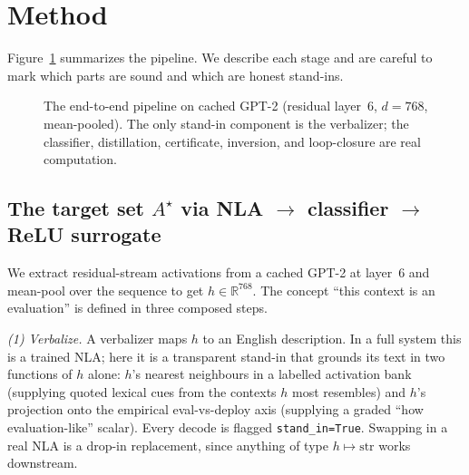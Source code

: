 \section{Method}
\label{sec:method}

Figure~\ref{fig:pipeline} summarizes the pipeline. We describe each stage and are
careful to mark which parts are sound and which are honest stand-ins.

\begin{figure}[t]
\centering
{}
\caption{The end-to-end pipeline on cached GPT-2 (residual layer~6, $d=768$,
mean-pooled). The only stand-in component is the verbalizer; the classifier,
distillation, certificate, inversion, and loop-closure are real computation.}
\label{fig:pipeline}
\end{figure}

\subsection{The target set $A^\star$ via NLA $\to$ classifier $\to$ ReLU surrogate}

We extract residual-stream activations from a cached GPT-2 at layer~6 and mean-pool
over the sequence to get $h \in \mathbb{R}^{768}$. The concept ``this context is an
evaluation'' is defined in three composed steps.

\emph{(1) Verbalize.} A verbalizer maps $h$ to an English description. In a full
system this is a trained NLA; here it is a transparent stand-in that grounds its
text in two functions of $h$ alone: $h$'s nearest neighbours in a labelled
activation bank (supplying quoted lexical cues from the contexts $h$ most resembles)
and $h$'s projection onto the empirical eval-vs-deploy axis (supplying a graded
``how evaluation-like'' scalar). Every decode is flagged \texttt{stand\_in=True}.
Swapping in a real NLA is a drop-in replacement, since anything of type
$h \mapsto \text{str}$ works downstream.

